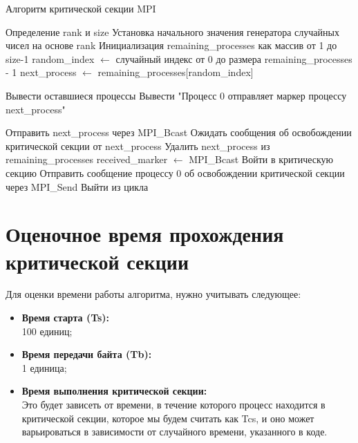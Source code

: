 \documentclass[openany, twoside, a4paper, 12pt]{extbook}
\begin{document}
	\begin{algorithm}[b]
		\caption{Алгоритм критической секции MPI}
		\label{alg:all}
		\begin{algorithmic}[1]
			\STATE Определение rank и size
			\STATE Установка начального значения генератора случайных чисел на основе rank
			    \STATE Инициализация remaining\_processes как массив от 1 до size-1
			        \STATE random\_index $\gets$ случайный индекс от 0 до размера remaining\_processes - 1
			        \STATE next\_process $\gets$ remaining\_processes[random\_index]
			        
			        \STATE Вывести оставшиеся процессы
			        \STATE Вывести "Процесс 0 отправляет маркер процессу next\_process"
			        
			        \STATE Отправить next\_process через MPI\_Bcast
			        \STATE Ожидать сообщения об освобождении критической секции от next\_process
			        \STATE Удалить next\_process из remaining\_processes
			    \ENDWHILE
			\ELSE
			        \STATE received\_marker $\gets$ MPI\_Bcast
			            \STATE Войти в критическую секцию
			            \STATE Отправить сообщение процессу 0 об освобождении критической секции через MPI\_Send
			            \STATE Выйти из цикла
			        \ENDIF
			    \ENDWHILE
			\ENDIF		
		\end{algorithmic}
	\end{algorithm}
	
	\section*{Оценочное время прохождения критической секции}
		Для оценки времени работы алгоритма, нужно учитывать следующее:
		\begin{itemize}
			\item{\textbf{Время старта (Ts):}}\\ 100 единиц;
			\item{\textbf{Время передачи байта (Tb):}}\\ 1 единица;
			\item{\textbf{Время выполнения критической секции:}}\\
			Это будет зависеть от времени, в течение которого процесс находится в критической секции,
			которое мы будем считать как Tcs,
			и оно может варьироваться в зависимости от случайного времени,
			указанного в коде.
		\end{itemize}
\end{document}
